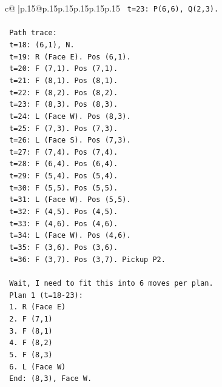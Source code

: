 \documentclass{article}
\begin{document}
{\begin{supertabular}{c@{$\;$}|p{.15\linewidth}@{}p{.15\linewidth}p{.15\linewidth}p{.15\linewidth}p{.15\linewidth}p{.15\linewidth}}
{{{\texttt{       t=23: P(6,6), Q(2,3).} \\
\\ 
\texttt{       Path trace:} \\
\texttt{       t=18: (6,1), N.} \\
\texttt{       t=19: R (Face E). Pos (6,1).} \\
\texttt{       t=20: F (7,1). Pos (7,1).} \\
\texttt{       t=21: F (8,1). Pos (8,1).} \\
\texttt{       t=22: F (8,2). Pos (8,2).} \\
\texttt{       t=23: F (8,3). Pos (8,3).} \\
\texttt{       t=24: L (Face W). Pos (8,3).} \\
\texttt{       t=25: F (7,3). Pos (7,3).} \\
\texttt{       t=26: L (Face S). Pos (7,3).} \\
\texttt{       t=27: F (7,4). Pos (7,4).} \\
\texttt{       t=28: F (6,4). Pos (6,4).} \\
\texttt{       t=29: F (5,4). Pos (5,4).} \\
\texttt{       t=30: F (5,5). Pos (5,5).} \\
\texttt{       t=31: L (Face W). Pos (5,5).} \\
\texttt{       t=32: F (4,5). Pos (4,5).} \\
\texttt{       t=33: F (4,6). Pos (4,6).} \\
\texttt{       t=34: L (Face W). Pos (4,6).} \\
\texttt{       t=35: F (3,6). Pos (3,6).} \\
\texttt{       t=36: F (3,7). Pos (3,7). Pickup P2.} \\
\\ 
\texttt{       Wait, I need to fit this into 6 moves per plan.} \\
\texttt{       Plan 1 (t=18{-}23):} \\
\texttt{       1. R (Face E)} \\
\texttt{       2. F (7,1)} \\
\texttt{       3. F (8,1)} \\
\texttt{       4. F (8,2)} \\
\texttt{       5. F (8,3)} \\
\texttt{       6. L (Face W)} \\
\texttt{       End: (8,3), Face W.} \\
\\ 
}}}
\end{supertabular}}
\end{document}
